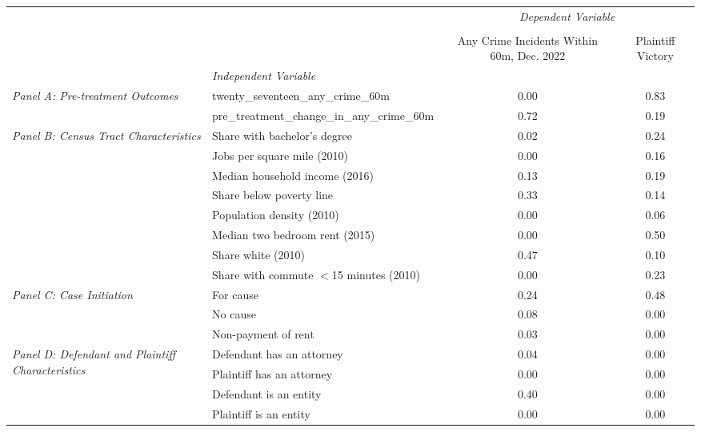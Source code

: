 \begin{tabular}{llcc}
\toprule
 &  & \multicolumn{2}{c}{\textit{Dependent Variable}} \\
\cline{3-4}
\\
 &  & Any Crime Incidents Within 60m, Dec. 2022 & Plaintiff Victory \\
 & \emph{Independent Variable} &  &  \\
\midrule
\multirow[c]{2}{3cm}{\textit{Panel A: Pre-treatment Outcomes}} & twenty_seventeen_any_crime_60m & 0.00 & 0.83 \\
 & pre_treatment_change_in_any_crime_60m & 0.72 & 0.19 \\
\cline{1-4}
\multirow[c]{8}{3cm}{\textit{Panel B: Census Tract Characteristics}} & Share with bachelor's degree & 0.02 & 0.24 \\
 & Jobs per square mile (2010) & 0.00 & 0.16 \\
 & Median household income (2016) & 0.13 & 0.19 \\
 & Share below poverty line & 0.33 & 0.14 \\
 & Population density (2010) & 0.00 & 0.06 \\
 & Median two bedroom rent (2015) & 0.00 & 0.50 \\
 & Share white (2010) & 0.47 & 0.10 \\
 & Share with commute $<$15 minutes (2010) & 0.00 & 0.23 \\
\cline{1-4}
\multirow[c]{3}{3cm}{\textit{Panel C: Case Initiation}} & For cause & 0.24 & 0.48 \\
 & No cause & 0.08 & 0.00 \\
 & Non-payment of rent & 0.03 & 0.00 \\
\cline{1-4}
\multirow[c]{4}{3cm}{\textit{Panel D: Defendant and Plaintiff Characteristics}} & Defendant has an attorney & 0.04 & 0.00 \\
 & Plaintiff has an attorney & 0.00 & 0.00 \\
 & Defendant is an entity & 0.40 & 0.00 \\
 & Plaintiff is an entity & 0.00 & 0.00 \\
\cline{1-4}
\bottomrule
\end{tabular}
